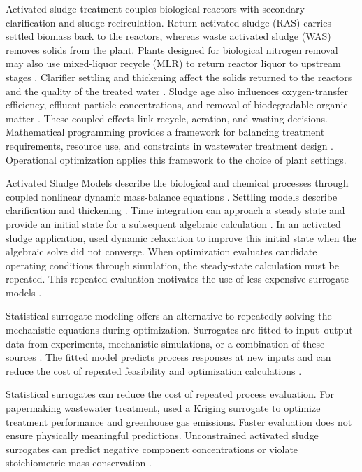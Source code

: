 \documentclass[a4paper,fleqn]{cas-sc}
\begin{document}
Activated sludge treatment couples biological reactors with secondary clarification and sludge recirculation. Return activated sludge (RAS) carries settled biomass back to the reactors, whereas waste activated sludge (WAS) removes solids from the plant. Plants designed for biological nitrogen removal may also use mixed-liquor recycle (MLR) to return reactor liquor to upstream stages \citep{Henze2008}. Clarifier settling and thickening affect the solids returned to the reactors and the quality of the treated water \citep{HartelPopel1992}. Sludge age also influences oxygen-transfer efficiency, effluent particle concentrations, and removal of biodegradable organic matter \citep{Leu2012}. These coupled effects link recycle, aeration, and wasting decisions. Mathematical programming provides a framework for balancing treatment requirements, resource use, and constraints in wastewater treatment design \citep{PadronPaez2020,Aboagye2021}. Operational optimization applies this framework to the choice of plant settings.

Activated Sludge Models describe the biological and chemical processes through coupled nonlinear dynamic mass-balance equations \citep{Henze2006}. Settling models describe clarification and thickening \citep{Takacs1991}. Time integration can approach a steady state and provide an initial state for a subsequent algebraic calculation \citep{KelleyKeyes1998,Selerio2026}. In an activated sludge application, \citet{Selerio2026} used dynamic relaxation to improve this initial state when the algebraic solve did not converge. When optimization evaluates candidate operating conditions through simulation, the steady-state calculation must be repeated. This repeated evaluation motivates the use of less expensive surrogate models \citep{Bhosekar2018}.

Statistical surrogate modeling offers an alternative to repeatedly solving the mechanistic equations during optimization. Surrogates are fitted to input--output data from experiments, mechanistic simulations, or a combination of these sources \citep{McBride2019}. The fitted model predicts process responses at new inputs and can reduce the cost of repeated feasibility and optimization calculations \citep{Bhosekar2018}.

Statistical surrogates can reduce the cost of repeated process evaluation. For papermaking wastewater treatment, \citet{He2023} used a Kriging surrogate to optimize treatment performance and greenhouse gas emissions. Faster evaluation does not ensure physically meaningful predictions. Unconstrained activated sludge surrogates can predict negative component concentrations or violate stoichiometric mass conservation \citep{Selerio2026}.
\end{document}
